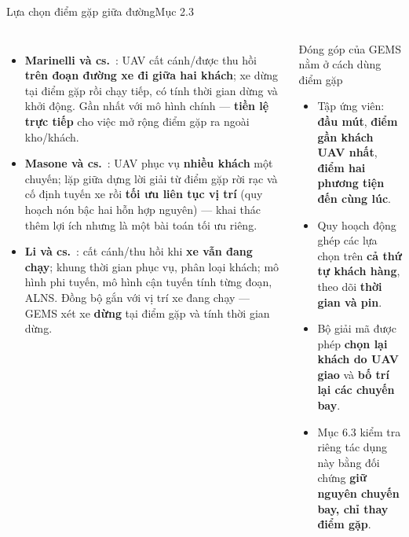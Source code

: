\documentclass[aspectratio=169,10pt,t,xcolor={table}]{beamer}
\newcommand{\src}[1]{\hfill{\normalfont\footnotesize\color{white!62!navy}#1}}  %
\begin{document}
\begin{frame}{Lựa chọn điểm gặp giữa đường\src{Mục 2.3}}
\begin{columns}[T,onlytextwidth]
\begin{itemize}\footnotesize
\item \textbf{Marinelli và cs.}~\cite{marinelli2018}: UAV cất cánh/được thu hồi \textbf{trên đoạn đường xe đi giữa hai khách}; xe dừng tại điểm gặp rồi chạy tiếp, có tính thời gian dừng và khởi động. Gần nhất với mô hình chính --- \textbf{tiền lệ trực tiếp} cho việc mở rộng điểm gặp ra ngoài kho/khách.
\item \textbf{Masone và cs.}~\cite{masone2022}: UAV phục vụ \textbf{nhiều khách} một chuyến; lặp giữa dựng lời giải từ điểm gặp rời rạc và cố định tuyến xe rồi \textbf{tối ưu liên tục vị trí} (quy hoạch nón bậc hai hỗn hợp nguyên) --- khai thác thêm lợi ích nhưng là một bài toán tối ưu riêng.
\item \textbf{Li và cs.}~\cite{li2022}: cất cánh/thu hồi khi \textbf{xe vẫn đang chạy}; khung thời gian phục vụ, phân loại khách; mô hình phi tuyến, mô hình cận tuyến tính từng đoạn, ALNS. Đồng bộ gắn với vị trí xe đang chạy --- GEMS xét xe \textbf{dừng} tại điểm gặp và tính thời gian dừng.
\end{itemize}
\begin{alertblock}{Đóng góp của GEMS nằm ở cách dùng điểm gặp}
\footnotesize
\begin{itemize}
\item Tập ứng viên: \textbf{đầu mút}, \textbf{điểm gần khách UAV nhất}, \textbf{điểm hai phương tiện đến cùng lúc}.
\item Quy hoạch động ghép các lựa chọn trên \textbf{cả thứ tự khách hàng}, theo dõi \textbf{thời gian và pin}.
\item Bộ giải mã được phép \textbf{chọn lại khách do UAV giao} và \textbf{bố trí lại các chuyến bay}.
\item Mục 6.3 kiểm tra riêng tác dụng này bằng đối chứng \textbf{giữ nguyên chuyến bay, chỉ thay điểm gặp}.
\end{itemize}
\end{alertblock}
\end{columns}
\end{frame}
\end{document}
